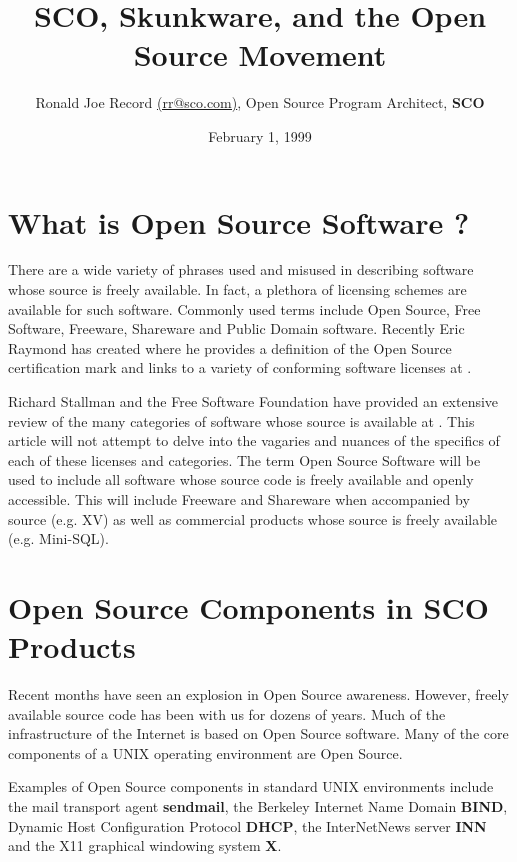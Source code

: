 \documentclass[letterpaper]{article}
\title{SCO, Skunkware, and the Open Source Movement}
\author{Ronald Joe Record
{\ttfamily \url{(rr@sco.com)}},
{\ttfamily Open Source Program Architect},
{\bfseries SCO}}
\date{February 1, 1999}
\begin{document}
\maketitle

\section{What is Open Source Software ?}



There are a wide variety of phrases used and misused in describing software
whose source is freely available. In fact, a plethora of licensing schemes
are available for such software. Commonly used terms include Open Source,
Free Software, Freeware, Shareware and Public Domain software. Recently Eric 
Raymond has created  where he provides a 
definition of the Open Source certification mark and links to a variety of 
conforming software licenses at .

Richard Stallman and the Free Software Foundation have provided an extensive
review of the many categories of software whose source is available at
. This article will
not attempt to delve into the vagaries and nuances of the specifics of each
of these licenses and categories. The term Open Source Software will be used
to include all software whose source code is freely available and openly 
accessible. This will include Freeware and Shareware when accompanied by
source (e.g. XV) as well as commercial products whose source is freely 
available (e.g. Mini-SQL).




\section{Open Source Components in SCO Products}

Recent months have seen an explosion in Open Source awareness. However, freely
available source code has been with us for dozens of years. Much of the
infrastructure of the Internet is based on Open Source software. Many of
the core components of a UNIX operating environment are Open Source.

Examples of Open Source components in standard UNIX environments include
the mail transport agent {\bfseries sendmail}, the Berkeley Internet Name Domain
{\bfseries BIND}, Dynamic Host Configuration Protocol {\bfseries DHCP},
the InterNetNews server {\bfseries INN} and the X11 graphical windowing system
{\bfseries X}.
\end{document}
